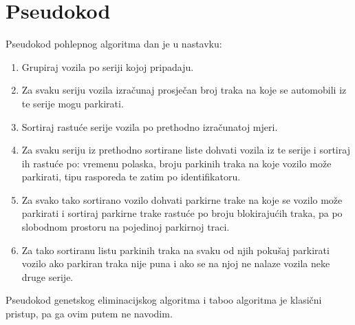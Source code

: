 \documentclass[11pt]{article}
\begin{document}
\section{Pseudokod}
Pseudokod pohlepnog algoritma dan je u nastavku:


\begin{enumerate}
  \item Grupiraj vozila po seriji kojoj pripadaju.
  \item Za svaku seriju vozila izračunaj prosječan broj traka na koje se automobili iz te serije mogu parkirati.
  \item Sortiraj rastuće serije vozila po prethodno izračunatoj mjeri.
  \item Za svaku seriju iz prethodno sortirane liste dohvati vozila iz te serije i sortiraj ih rastuće po: vremenu polaska, broju parkinih traka na koje vozilo može parkirati, tipu rasporeda te zatim po identifikatoru.
  \item Za svako tako sortirano vozilo dohvati parkirne trake na koje se vozilo može parkirati i sortiraj parkirne trake rastuće po broju blokirajućih traka, pa po slobodnom prostoru na pojedinoj parkirnoj traci.
  \item Za tako sortiranu listu parkinih traka na svaku od njih pokušaj parkirati vozilo ako parkiran traka nije puna i ako se na njoj ne nalaze vozila neke druge serije.
\end{enumerate}

Pseudokod genetskog eliminacijskog algoritma i taboo algoritma je klasični pristup, pa ga ovim putem ne navodim.
\end{document}

